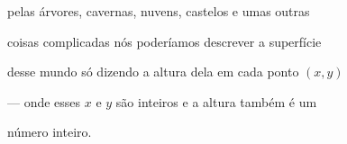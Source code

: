 \documentclass[oneside,12pt]{article}
\begin{document}
pelas árvores, cavernas, nuvens, castelos e umas outras

coisas complicadas nós poderíamos descrever a superfície

desse mundo só dizendo a altura dela em cada ponto $(x,y)$

--- onde esses $x$ e $y$ são inteiros e a altura também é um

número inteiro.





\newpage



\end{document}
